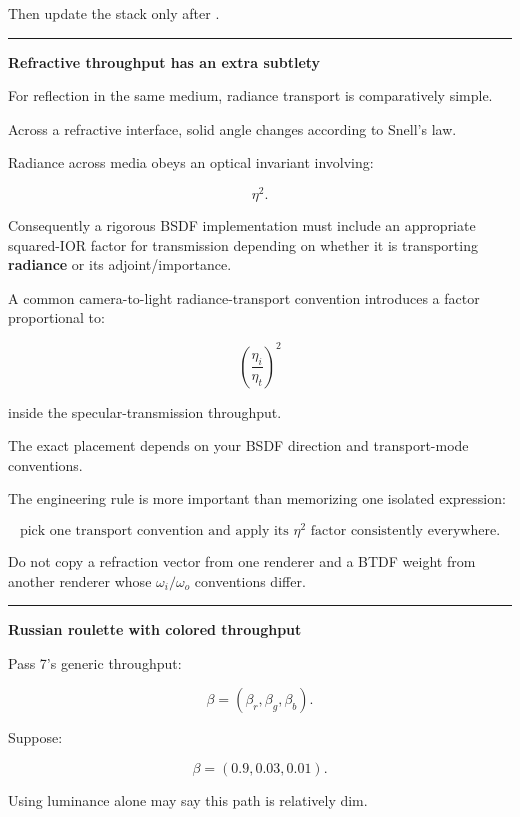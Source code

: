 Then update the stack only after .

\begin{center}\rule{0.5\linewidth}{0.5pt}\end{center}

\textbf{Refractive throughput has an extra subtlety}

For reflection in the same medium, radiance transport is comparatively simple.

Across a refractive interface, solid angle changes according to Snell's law.

Radiance across media obeys an optical invariant involving:

\[
\eta^2.
\]

Consequently a rigorous BSDF implementation must include an appropriate squared-IOR factor for transmission depending on whether it is transporting \textbf{radiance} or its adjoint/importance.

A common camera-to-light radiance-transport convention introduces a factor proportional to:

\[
\boxed{
\left(
\frac{\eta_i}{\eta_t}
\right)^2
}
\]

inside the specular-transmission throughput.

The exact placement depends on your BSDF direction and transport-mode conventions.

The engineering rule is more important than memorizing one isolated expression:

\[
\boxed{
\text{pick one transport convention and apply its } \eta^2 \text{ factor consistently everywhere}.
}
\]

Do not copy a refraction vector from one renderer and a BTDF weight from another renderer whose \(\omega_i/\omega_o\) conventions differ.

\begin{center}\rule{0.5\linewidth}{0.5pt}\end{center}

\textbf{Russian roulette with colored throughput}

Pass 7's generic throughput:

\[
\beta=
(\beta_r,\beta_g,\beta_b).
\]

Suppose:

\[
\beta=
(0.9,0.03,0.01).
\]

Using luminance alone may say this path is relatively dim.

